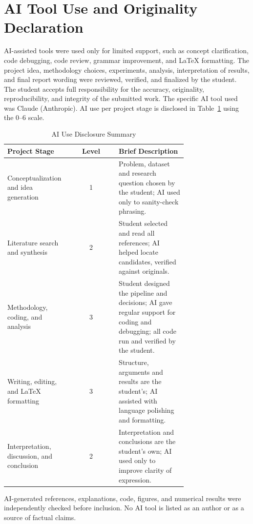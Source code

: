 \documentclass[conference]{IEEEtran}
\begin{document}
	\section*{AI Tool Use and Originality Declaration}
	\label{sec:ai_declaration}
	
	AI-assisted tools were used only for limited support, such as concept clarification, code debugging, code review, grammar improvement, and LaTeX formatting. The project idea, methodology choices, experiments, analysis, interpretation of results, and final report wording were reviewed, verified, and finalized by the student. The student accepts full responsibility for the accuracy, originality, reproducibility, and integrity of the submitted work. The specific AI tool used was Claude (Anthropic). AI use per project stage is disclosed in Table~\ref{tab:ai_use} using the 0--6 scale.
	
	\begin{table}[htbp]
		\caption{AI Use Disclosure Summary}
		\label{tab:ai_use}
		\centering
		\footnotesize
		\begin{tabular}{|p{0.35\linewidth}|c|p{0.38\linewidth}|}
			\hline
			\textbf{Project Stage} & \textbf{Level} & \textbf{Brief Description} \\
			\hline
			Conceptualization and idea generation & 1 & Problem, dataset and research question chosen by the student; AI used only to sanity-check phrasing. \\
			\hline
			Literature search and synthesis & 2 & Student selected and read all references; AI helped locate candidates, verified against originals. \\
			\hline
			Methodology, coding, and analysis & 3 & Student designed the pipeline and decisions; AI gave regular support for coding and debugging; all code run and verified by the student. \\
			\hline
			Writing, editing, and LaTeX formatting & 3 & Structure, arguments and results are the student's; AI assisted with language polishing and formatting. \\
			\hline
			Interpretation, discussion, and conclusion & 2 & Interpretation and conclusions are the student's own; AI used only to improve clarity of expression. \\
			\hline
		\end{tabular}
	\end{table}
	
	AI-generated references, explanations, code, figures, and numerical results were independently checked before inclusion. No AI tool is listed as an author or as a source of factual claims.
	
\end{document}
